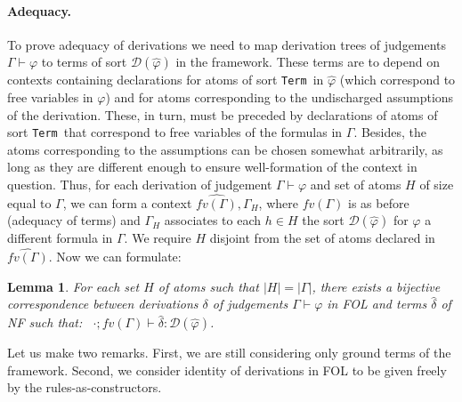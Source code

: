 \documentclass[11pt,a4paper]{amsart}
\newtheorem{lemma}{Lemma}
\newcounter{s}
\newcommand{\typing}[2]{\ensuremath{#1 : #2}}
\newcommand{\emptyCtx}{\cdot}
\newcommand{\tyjdgmnt}[5]{\ensuremath{#1;#2\vdash \typing{#4}{#5}}}
\newcommand{\prf}{\ensuremath{\mathcal{D}}}
\newcommand{\Trm}{\texttt{Term}}
\begin{document}
\paragraph{Adequacy.}
To prove adequacy of derivations we need to map derivation trees of judgements $\Gamma \vdash \varphi$ to terms  of sort $\prf(\hat{\varphi})$ in the framework. 
These terms are to depend on contexts containing declarations for atoms of sort \Trm\ in $\hat{\varphi}$ (which correspond to free variables in $\varphi$) and for atoms corresponding to the undischarged assumptions of the derivation. 
These, in turn, must be preceded by declarations of atoms of sort \Trm\ that correspond to free variables of the formulas in $\Gamma$.
Besides, the atoms corresponding to the assumptions can be chosen somewhat arbitrarily, as long as they are different enough to ensure well-formation of the context in question.
Thus, for each derivation of judgement $\Gamma \vdash \varphi$ and set of atoms $H$ of size equal to $\Gamma$, we can form a context $\widehat{fv(\Gamma)}, \Gamma_H$,  where $\widehat{fv(\Gamma)}$ is as before (adequacy of terms) and $\Gamma_H$ associates to each $h \in H$ the sort $\prf(\hat{\varphi})$ for $\varphi$ a different formula in $\Gamma$.
We require $H$ disjoint from the set of atoms declared in $\widehat{fv(\Gamma)}$. 
Now we can formulate:


\begin{lemma}
For each set $H$ of atoms such that $|H| = |\Gamma|$, there exists a bijective correspondence between derivations $\delta$ of judgements $\Gamma \vdash \varphi$ in FOL and terms $\hat{\delta}$ of NF such that: \ \tyjdgmnt{\emptyCtx}{\widehat{fv(\Gamma)}}{\emptyCtx}{\hat{\delta}}{\prf(\hat{\varphi})}.
\end{lemma}


\noindent
Let us make two remarks. First, we are still considering only ground terms of the framework.
Second,  we consider identity of derivations in FOL to be given freely by the rules-as-constructors.
\end{document}
